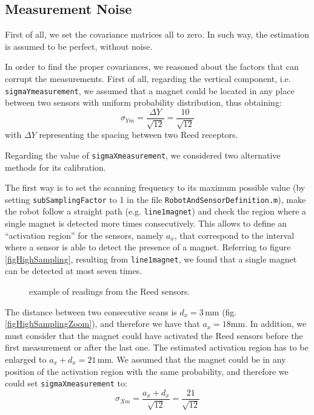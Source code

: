 \subsection{Measurement Noise}

First of all, we set the covariance matrices all to zero. In such way, the estimation is assumed to be perfect, without noise.

In order to find the proper covariances, we reasoned about the factors that can corrupt the measurements. First of all, regarding the vertical component, i.e. \texttt{sigmaYmeasurement}, we assumed that a magnet could be located in any place between two sensors with uniform probability distribution, thus obtaining:
$$\sigma_{Ym} = \frac{\Delta Y}{\sqrt{12}} = \frac{10}{\sqrt{12}} $$
with $\Delta Y$ representing the spacing between two Reed receptors.

Regarding the value of \texttt{sigmaXmeasurement}, we considered two alternative methods for its calibration.

The first way is to set the scanning frequency to its maximum possible value (by setting \texttt{subSamplingFactor} to 1 in the file \texttt{RobotAndSensorDefinition.m}), make the robot follow a straight path (e.g. \texttt{line1magnet}) and check the region where a single magnet is detected more times consecutively. This allows to define an ``activation region'' for the sensors, namely $a_x$, that correspond to the interval where a sensor is able to detect the presence of a magnet. Referring to figure \ref{figHighSampling}, resulting from \texttt{line1magnet}, we found that a single magnet can be detected at most seven times.

\begin{figure}[htbp]
	\centering
	\caption{example of readings from the Reed sensors.}
\end{figure}

The distance between two consecutive scans is $d_x = 3\,\textrm{mm}$ (fig. \ref{figHighSamplingZoom}), and therefore we have that $a_x=18\textrm{mm}$. In addition, we must consider that the magnet could have activated the Reed sensors before the first measurement or after the last one. The estimated activation region has to be enlarged to $a_x+d_x=21\,\textrm{mm}$. We assumed that the magnet could be in any position of the activation region with the same probability, and therefore we could set \texttt{sigmaXmeasurement} to:
$$ \sigma_{Xm} = \frac{a_x+d_x}{\sqrt{12}} = \frac{21}{\sqrt{12}} $$

